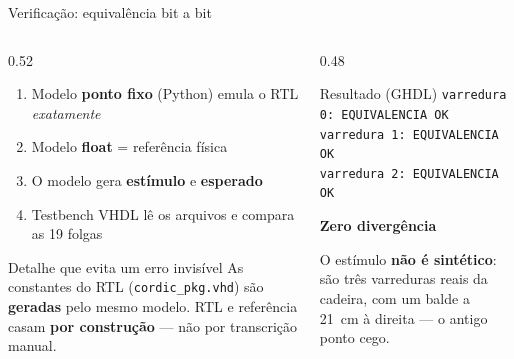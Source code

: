 \documentclass[aspectratio=169, 11pt]{beamer}
\begin{document}
\begin{frame}{Verificação: equivalência bit a bit}
\begin{columns}[T]
\begin{column}{0.52\textwidth}
\footnotesize
\begin{enumerate}
\item Modelo \textbf{ponto fixo} (Python) emula o RTL \emph{exatamente}
\item Modelo \textbf{float} = referência física
\item O modelo gera \textbf{estímulo} e \textbf{esperado}
\item Testbench VHDL lê os arquivos e compara as 19 folgas
\end{enumerate}

\vspace{3mm}
\begin{block}{\footnotesize Detalhe que evita um erro invisível}
\scriptsize As constantes do RTL (\texttt{cordic\_pkg.vhd}) são \textbf{geradas}
pelo mesmo modelo. RTL e referência casam \textbf{por construção} --- não por
transcrição manual.
\end{block}
\end{column}
\begin{column}{0.48\textwidth}
\begin{exampleblock}{Resultado (GHDL)}
\scriptsize
\texttt{varredura 0: EQUIVALENCIA OK}\\
\texttt{varredura 1: EQUIVALENCIA OK}\\
\texttt{varredura 2: EQUIVALENCIA OK}
\vspace{1mm}

\normalsize\centering
\textbf{Zero divergência}
\end{exampleblock}

\vspace{2mm}
\footnotesize
O estímulo \textbf{não é sintético}: são três varreduras \alert{reais} da cadeira,
com um balde a \SI{21}{\centi\metre} à direita --- o antigo ponto cego.
\end{column}
\end{columns}
\end{frame}
\end{document}
